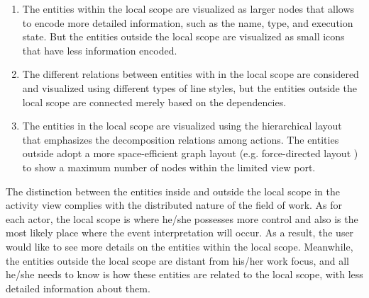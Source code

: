 \begin{enumerate}
	\item The entities within the local scope are visualized as larger nodes that allows to encode more detailed information, such as the name, type, and execution state. But the entities outside the local scope are visualized as small icons that have less information encoded. 
	\item The different relations between entities with in the local scope are considered and visualized using different types of line styles, but the entities outside the local scope are connected merely based on the dependencies. 
	\item The entities in the local scope are visualized using the hierarchical layout that emphasizes the decomposition relations among actions. The entities outside adopt a more space-efficient graph layout (e.g. force-directed layout \cite{Fruchterman1991}) to show a maximum number of nodes within the limited view port.
\end{enumerate}

The distinction between the entities inside and outside the local scope in the activity view complies with the distributed nature of the field of work. As for each actor, the local scope is where he/she possesses more control and also is the most likely place where the event interpretation will occur. As a result, the user would like to see more details on the entities within the local scope. Meanwhile, the entities outside the local scope are distant from his/her work focus, and all he/she needs to know is how these entities are related to the local scope, with less detailed information about them.


